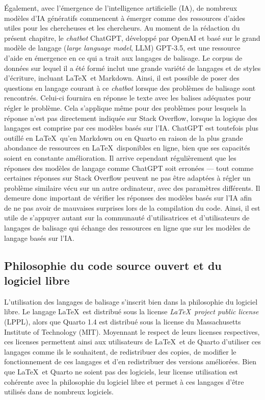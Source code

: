 \documentclass[
  letterpaper,
]{scrbook}
\begin{document}
Également, avec l'émergence de l'intelligence artificielle (IA), de
nombreux modèles d'IA génératifs commencent à émerger comme des
ressources d'aides utiles pour les chercheuses et les chercheurs. Au
moment de la rédaction du présent chapitre, le \emph{chatbot} ChatGPT,
développé par OpenAI et basé sur le grand modèle de langage (\emph{large
language model}, LLM) GPT-3.5, est une ressource d'aide en émergence en
ce qui a trait aux langages de balisage. Le corpus de données sur lequel
il a été formé inclut une grande variété de langages et de styles
d'écriture, incluant \LaTeX~et Markdown. Ainsi, il est possible de poser
des questions en langage courant à ce \emph{chatbot} lorsque des
problèmes de balisage sont rencontrés. Celui-ci fournira en réponse le
texte avec les balises adéquates pour régler le problème. Cela
s'applique même pour des problèmes pour lesquels la réponse n'est pas
directement indiquée sur Stack Overflow, lorsque la logique des langages
est comprise par ces modèles basés sur l'IA. ChatGPT est toutefois plus
outillé en \LaTeX~qu'en Markdown ou en Quarto en raison de la plus
grande abondance de ressources en \LaTeX~disponibles en ligne, bien que
ses capacités soient en constante amélioration. Il arrive cependant
régulièrement que les réponses des modèles de langage comme ChatGPT soit
erronées --- tout comme certaines réponses sur Stack Overflow peuvent ne
pas être adaptées à régler un problème similaire vécu sur un autre
ordinateur, avec des paramètres différents. Il demeure donc important de
vérifier les réponses des modèles basés sur l'IA afin de ne pas avoir de
mauvaises surprises lors de la compilation du code. Ainsi, il est utile
de s'appuyer autant sur la communauté d'utilisatrices et d'utilisateurs
de langages de balisage qui échange des ressources en ligne que sur les
modèles de langage basés sur l'IA.

\hypertarget{philosophie-du-code-source-ouvert-et-du-logiciel-libre}{%
\subsection{Philosophie du code source ouvert et du logiciel
libre}\label{philosophie-du-code-source-ouvert-et-du-logiciel-libre}}

L'utilisation des langages de balisage s'inscrit bien dans la
philosophie du logiciel libre. Le langage \LaTeX~est distribué sous la
license \emph{\LaTeX~project public license} (LPPL), alors que Quarto
1.4 est distribué sous la license du Massachusetts Institute of
Technology (MIT). Moyennant le respect de leurs licenses respectives,
ces licenses permettent ainsi aux utilisateurs de \LaTeX~et de Quarto
d'utiliser ces langages comme ils le souhaitent, de redistribuer des
copies, de modifier le fonctionnement de ces langages et d'en
redistribuer des versions améliorées. Bien que \LaTeX~et Quarto ne
soient pas des logiciels, leur license utilisation est cohérente avec la
philosophie du logiciel libre et permet à ces langages d'être utilisés
dans de nombreux logiciels.
\end{document}
